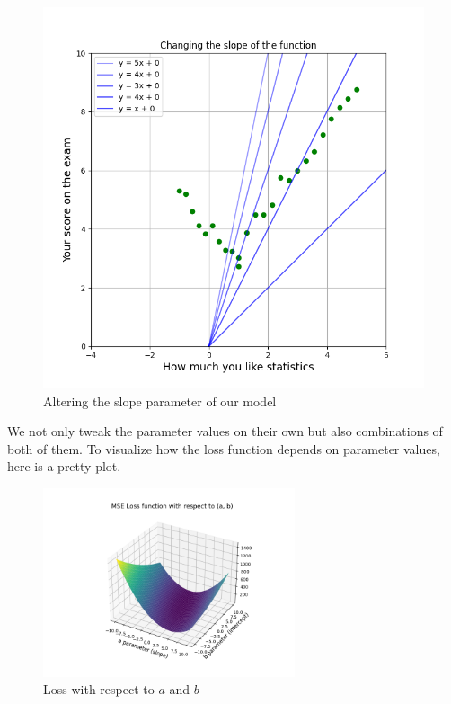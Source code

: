 \documentclass{article}
\begin{document}
\begin{figure}[h]
\begin{minipage}{0.4\textwidth}
        \includegraphics[width=\linewidth]{../images/myplot4.png}
        \caption{Altering the slope parameter of our model}
    \end{minipage}
\end{figure}

We not only tweak the parameter values on their own but also combinations of both of them. To visualize how the loss function depends on parameter values, here is a pretty plot.

\begin{figure}[h]
    \centering
    \includegraphics[width=0.66\textwidth]{../images/myplot5.png}
    \caption{Loss with respect to $a$ and $b$}
    \label{fig:loss_3d}
\end{figure}
\end{document}
